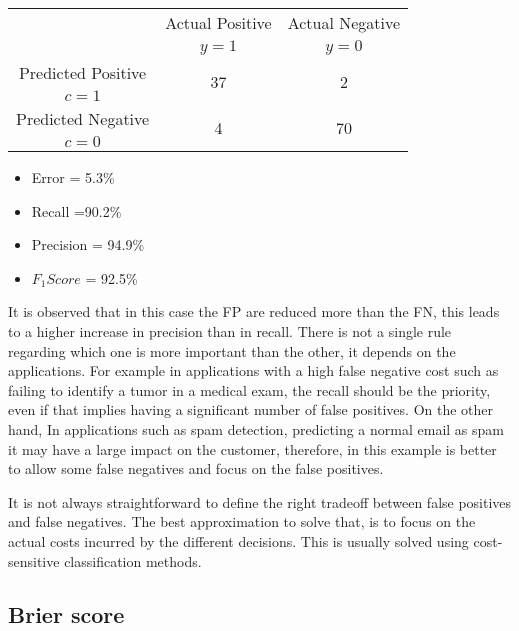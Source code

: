 \begin{center}
		\footnotesize
    \begin{tabular}{c|c|c}
			\multicolumn{1}{c|}{}  & Actual Positive& Actual Negative \\
			\multicolumn{1}{c|}{} & $y=1$& $y=0$ \\
			\hline
			Predicted Positive 		& \multirow{ 2}{*}{37} & \multirow{ 
			2}{*}{2} \\
			$c=1$ & &\\
			\hline
			Predicted Negative  	& \multirow{ 2}{*}{4} & \multirow{ 
			2}{*}{70} \\
			$c=0$ & &\\
		\end{tabular}
\end{center}
  \begin{itemize}
    \item Error = 5.3\%
    \item Recall =90.2\%
    \item Precision = 94.9\%
    \item $F_1Score$ = 92.5\%
  \end{itemize}
It is observed that in this case the FP are reduced more than the FN, this leads to a higher 
increase in precision  than in recall. There is not a single rule regarding which one is more 
important than the other, it depends on the applications. For example in applications with a high 
false negative cost such as failing to identify a tumor in a medical exam, the recall should be the 
priority, even if that implies having a significant number of false positives. On the other hand, 
In applications such as spam detection, predicting a normal email as spam it may have a large 
impact on the customer, therefore, in this example is better to allow some false negatives and 
focus on the false positives.

It is not always straightforward  to define the right tradeoff between false positives 
and false negatives. The best approximation to solve that, is to focus on the actual costs incurred 
by the different decisions. This is usually solved using cost-sensitive classification methods. 

\subsection{Brier score}
\label{sec:2:brier}


